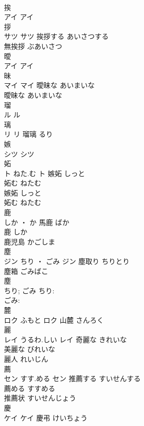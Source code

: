 \documentclass[8pt]{extreport}
\begin{document}
\begin{CJK}{UTF8}{min}
\\	挨	
\\	アイ		アイ																																			
\\	拶	
\\	サツ		サツ	挨拶する	あいさつする	
\\	無挨拶	ぶあいさつ	
\\	曖	
\\	アイ		アイ																																			
\\	昧	
\\	マイ		マイ	曖昧な	あいまいな	
\\	曖昧な	あいまいな	
\\	瑠	
\\	ル		ル																																			
\\	璃	
\\	リ		リ													瑠璃	るり	
\\	嫉	
\\	シツ		シツ																																			
\\	妬	
\\	ト	ねた.む	ト	嫉妬	しっと	
\\	妬む	ねたむ	
\\	嫉妬	しっと	
\\	妬む	ねたむ	
\\	鹿	
\\	しか ・ か		馬鹿	ばか	
\\	鹿	しか	
\\	鹿児島	かごしま	
\\	塵	
\\	ジン	ちり ・ ごみ	ジン	塵取り	ちりとり	
\\	塵箱	ごみばこ	
\\	塵 
\\	ちり; ごみ	ちり: 
\\	ごみ: 
\\	麓	
\\	ロク	ふもと	ロク													山麓	さんろく	
\\	麗	
\\	レイ	うるわ.しい	レイ	奇麗な	きれいな	
\\	美麗な	びれいな	
\\	麗人	れいじん	
\\	薦	
\\	セン	すす.める	セン	推薦する	すいせんする	
\\	薦める	すすめる	
\\	推薦状	すいせんじょう	
\\	慶	
\\	ケイ		ケイ	慶弔	けいちょう	

\end{CJK}
\end{document}

